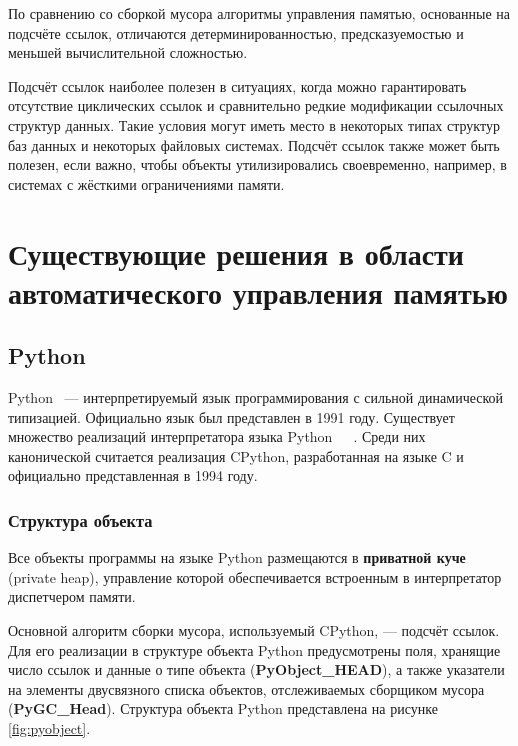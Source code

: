 По сравнению со сборкой мусора алгоритмы управления памятью, основанные на подсчёте ссылок, отличаются детерминированностью, предсказуемостью и меньшей вычислительной сложностью.~\cite{cornell2} %

Подсчёт ссылок наиболее полезен в ситуациях, когда можно гарантировать отсутствие циклических ссылок и сравнительно редкие модификации ссылочных структур данных. Такие условия могут иметь место в некоторых типах структур баз данных и некоторых файловых системах. Подсчёт ссылок также может быть полезен, если важно, чтобы объекты утилизировались своевременно, например, в системах с жёсткими ограничениями памяти.~\cite{recycling}




\section{Существующие решения в области автоматического управления памятью}

\subsection{Python}

Python~\cite{python} --- интерпретируемый язык программирования с сильной динамической типизацией. Официально язык был представлен в 1991 году. Существует множество реализаций интерпретатора языка Python~\cite{juthon}~\cite{ironpython}~\cite{pypy}. Среди них канонической считается реализация CPython, разработанная на языке C и официально представленная в 1994 году.~\cite{cpython}

\subsubsection{Структура объекта}

Все объекты программы на языке Python размещаются в \textbf{приватной куче} (private heap), управление которой обеспечивается встроенным в интерпретатор диспетчером памяти.~\cite{python_memory}

Основной алгоритм сборки мусора, используемый CPython, --- подсчёт ссылок. Для его реализации в структуре объекта Python предусмотрены поля, хранящие число ссылок и данные о типе объекта (\textbf{PyObject\_HEAD}), а также указатели на элементы двусвязного списка объектов, отслеживаемых сборщиком мусора (\textbf{PyGC\_Head}). Структура объекта Python представлена на рисунке \ref{fig:pyobject}.~\cite{python_gc}

